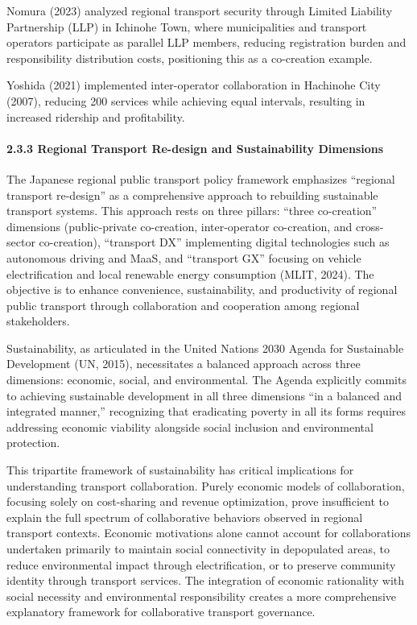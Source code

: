 Nomura (2023) analyzed regional transport security through Limited
Liability Partnership (LLP) in Ichinohe Town, where municipalities and
transport operators participate as parallel LLP members, reducing
registration burden and responsibility distribution costs, positioning
this as a co-creation example.

Yoshida (2021) implemented inter-operator collaboration in Hachinohe
City (2007), reducing 200 services while achieving equal intervals,
resulting in increased ridership and profitability.

\paragraph{2.3.3 Regional Transport Re-design and Sustainability
Dimensions}\label{regional-transport-re-design-and-sustainability-dimensions}

The Japanese regional public transport policy framework emphasizes
``regional transport re-design'' as a comprehensive approach to
rebuilding sustainable transport systems. This approach rests on three
pillars: ``three co-creation'' dimensions (public-private co-creation,
inter-operator co-creation, and cross-sector co-creation), ``transport
DX'' implementing digital technologies such as autonomous driving and
MaaS, and ``transport GX'' focusing on vehicle electrification and local
renewable energy consumption (MLIT, 2024). The objective is to enhance
convenience, sustainability, and productivity of regional public
transport through collaboration and cooperation among regional
stakeholders.

Sustainability, as articulated in the United Nations 2030 Agenda for
Sustainable Development (UN, 2015), necessitates a balanced approach
across three dimensions: economic, social, and environmental. The Agenda
explicitly commits to achieving sustainable development in all three
dimensions ``in a balanced and integrated manner,'' recognizing that
eradicating poverty in all its forms requires addressing economic
viability alongside social inclusion and environmental protection.

This tripartite framework of sustainability has critical implications
for understanding transport collaboration. Purely economic models of
collaboration, focusing solely on cost-sharing and revenue optimization,
prove insufficient to explain the full spectrum of collaborative
behaviors observed in regional transport contexts. Economic motivations
alone cannot account for collaborations undertaken primarily to maintain
social connectivity in depopulated areas, to reduce environmental impact
through electrification, or to preserve community identity through
transport services. The integration of economic rationality with social
necessity and environmental responsibility creates a more comprehensive
explanatory framework for collaborative transport governance.


